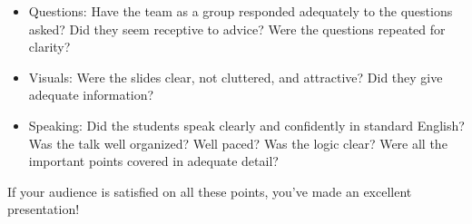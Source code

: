 \documentclass[12pt]{article}
\begin{document}
\begin{itemize}
\item Questions: Have the team as a group responded adequately to the
  questions asked? Did they seem receptive to advice? Were the
  questions repeated for clarity?

\item Visuals: Were the slides clear, not cluttered, and attractive?
  Did they give adequate information?

\item Speaking: Did the students speak clearly and confidently in
  standard English? Was the talk well organized? Well paced? Was the
  logic clear? Were all the important points covered in adequate
  detail?

\end{itemize}

If your audience is satisfied on all these points, you've made an excellent presentation!


\nocite{*}

\end{document}
